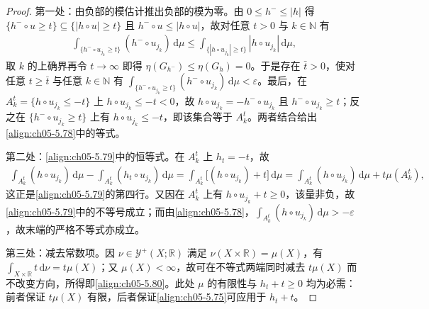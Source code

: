\documentclass[../../main.tex]{subfiles}
\begin{document}
\begin{proof}
第一处：由负部的模估计推出负部的模为零。由 $0\leqslant h^-\leqslant|h|$ 得 $\{h^-\circ u\geqslant t\}\subseteq\{|h\circ u|\geqslant t\}$ 且 $h^-\circ u\leqslant|h\circ u|$，故对任意 $t>0$ 与 $k\in\mathbb{N}$ 有
\begin{align*}
\int_{\{h^-\circ u_{j_k}\geqslant t\}}(h^-\circ u_{j_k})\,\mathrm{d}\mu
\leqslant\int_{\{|h\circ u_{j_k}|\geqslant t\}}|h\circ u_{j_k}|\,\mathrm{d}\mu,
\end{align*}
取 $k$ 的上确界再令 $t\to\infty$ 即得 $\eta(G_{h^-})\leqslant\eta(G_h)=0$。于是存在 $\bar t>0$，使对任意 $t\geqslant\bar t$ 与任意 $k\in\mathbb{N}$ 有 $\int_{\{h^-\circ u_{j_k}\geqslant t\}}(h^-\circ u_{j_k})\,\mathrm{d}\mu<\varepsilon$。最后，在 $A^t_k=\{h\circ u_{j_k}\leqslant-t\}$ 上 $h\circ u_{j_k}\leqslant-t<0$，故 $h\circ u_{j_k}=-h^-\circ u_{j_k}$ 且 $h^-\circ u_{j_k}\geqslant t$；反之在 $\{h^-\circ u_{j_k}\geqslant t\}$ 上有 $h\circ u_{j_k}\leqslant-t$，即该集合等于 $A^t_k$。两者结合给出\eqref{align:ch05-5.78}中的等式。

第二处：\eqref{align:ch05-5.79}中的恒等式。在 $A^t_k$ 上 $h_t=-t$，故
\begin{align*}
\int_{A^t_k}(h\circ u_{j_k})\,\mathrm{d}\mu-\int_{A^t_k}(h_t\circ u_{j_k})\,\mathrm{d}\mu
=\int_{A^t_k}\big[(h\circ u_{j_k})+t\big]\,\mathrm{d}\mu
=\int_{A^t_k}(h\circ u_{j_k})\,\mathrm{d}\mu+t\mu(A^t_k),
\end{align*}
这正是\eqref{align:ch05-5.79}的第四行。又因在 $A^t_k$ 上有 $h\circ u_{j_k}+t\geqslant0$，该量非负，故\eqref{align:ch05-5.79}中的不等号成立；而由\eqref{align:ch05-5.78}，$\int_{A^t_k}(h\circ u_{j_k})\,\mathrm{d}\mu>-\varepsilon$，故末端的严格不等式亦成立。

第三处：减去常数项。因 $\nu\in\mathcal{Y}^+(X;\mathbb{R})$ 满足 $\nu(X\times\mathbb{R})=\mu(X)$，有 $\int_{X\times\mathbb{R}}t\,\mathrm{d}\nu=t\mu(X)$；又 $\mu(X)<\infty$，故可在不等式两端同时减去 $t\mu(X)$ 而不改变方向，所得即\eqref{align:ch05-5.80}。此处 $\mu$ 的有限性与 $h_t+t\geqslant0$ 均为必需：前者保证 $t\mu(X)$ 有限，后者保证\eqref{align:ch05-5.75}可应用于 $h_t+t$。
\end{proof}
\end{document}
